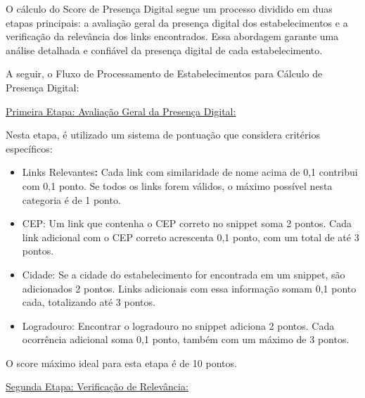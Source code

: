 \indent O cálculo do Score de Presença Digital segue um processo dividido em duas etapas principais: a avaliação geral da presença digital dos estabelecimentos e a verificação da relevância dos links encontrados. Essa abordagem garante uma análise detalhada e confiável da presença digital de cada estabelecimento.\par

\indent A seguir, o Fluxo de Processamento de Estabelecimentos para Cálculo de Presença Digital:\par


\indent \originalleadbreak{}\underline{Primeira Etapa: Avaliação Geral da Presença Digital:}\par

\indent Nesta etapa, é utilizado um sistema de pontuação que considera critérios específicos:\par

\begin{itemize}
\item Links Relevantes\textbf{:} Cada link com similaridade de nome acima de 0,1 contribui com 0,1 ponto. Se todos os links forem válidos, o máximo possível nesta categoria é de 1 ponto.
\item CEP: Um link que contenha o CEP correto no snippet soma 2 pontos. Cada link adicional com o CEP correto acrescenta 0,1 ponto, com um total de até 3 pontos.
\item Cidade: Se a cidade do estabelecimento for encontrada em um snippet, são adicionados 2 pontos. Links adicionais com essa informação somam 0,1 ponto cada, totalizando até 3 pontos.
\item Logradouro: Encontrar o logradouro no snippet adiciona 2 pontos. Cada ocorrência adicional soma 0,1 ponto, também com um máximo de 3 pontos.
\end{itemize}

\indent O score máximo ideal para esta etapa é de 10 pontos.\par

\indent \originalleadbreak{}\underline{Segunda Etapa: Verificação de Relevância:}\par

